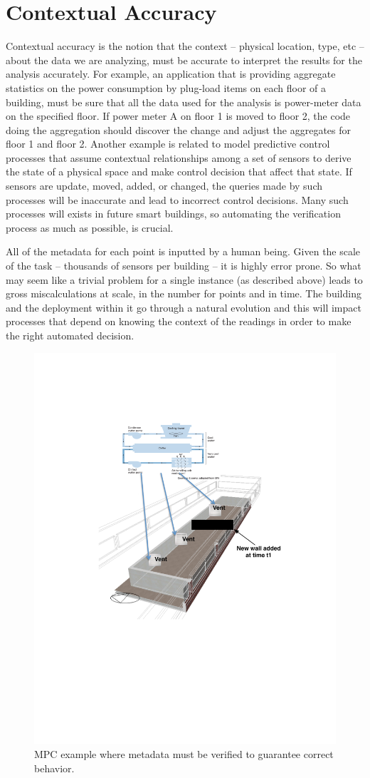 \section{Contextual Accuracy}

Contextual accuracy is the notion that the context -- physical location, type, etc -- about the data we are analyzing, must be accurate
to interpret the results for the analysis accurately.  For example, an application that is providing aggregate statistics on the 
power consumption by plug-load items on each floor of a building, must be sure that all the data used for the analysis 
is power-meter data on the specified floor.  If power meter A on floor 1 is moved to floor 2, the code doing the aggregation
should discover the change and adjust the aggregates for floor 1 and floor 2.  Another example is related to model predictive 
control processes that assume contextual relationships among a set of sensors to derive the state of a physical space and 
make control decision that affect that state.  If sensors are update, moved, added, or changed, the queries made by such processes
will be inaccurate and lead to incorrect control decisions.  Many such processes will exists in future smart buildings, so
automating the verification process as much as possible, is crucial.

All of the metadata for each point is inputted by a human being.  Given the scale of the task -- thousands of sensors per building --
it is highly error prone.  So what may seem like a trivial problem for a single instance (as described above) leads to gross
miscalculations at scale, in the number for points and in time.  The building and the deployment within it go through a natural
evolution and this will impact processes that depend on knowing the context of the readings in order to make the right automated decision.

\begin{figure}[h!] %
\centering
\includegraphics[width=0.5\columnwidth]{figs/mpc_example}
\caption{MPC example where metadata must be verified to guarantee correct behavior.}
\label{fig:mpc_example}
\end{figure}

